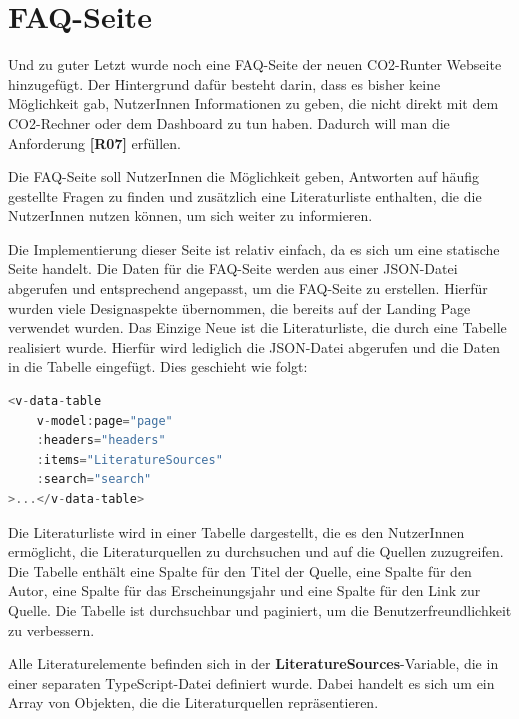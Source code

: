 \section{FAQ-Seite}

Und zu guter Letzt wurde noch eine FAQ-Seite der neuen CO2-Runter Webseite hinzugefügt. Der Hintergrund dafür besteht darin, dass es bisher keine Möglichkeit gab, NutzerInnen Informationen zu geben, die nicht direkt mit dem CO2-Rechner oder dem Dashboard zu tun haben. Dadurch will man die Anforderung \textbf{[R07]} erfüllen.

Die FAQ-Seite soll NutzerInnen die Möglichkeit geben, Antworten auf häufig gestellte Fragen zu finden und zusätzlich eine Literaturliste enthalten, die die NutzerInnen nutzen können, um sich weiter zu informieren.


Die Implementierung dieser Seite ist relativ einfach, da es sich um eine statische Seite handelt. Die Daten für die FAQ-Seite werden aus einer \acs{JSON}-Datei abgerufen und entsprechend angepasst, um die FAQ-Seite zu erstellen. Hierfür wurden viele Designaspekte übernommen, die bereits auf der Landing Page verwendet wurden. Das Einzige Neue ist die Literaturliste, die durch eine Tabelle realisiert wurde. Hierfür wird lediglich die \acs{JSON}-Datei abgerufen und die Daten in die Tabelle eingefügt. Dies geschieht wie folgt:

\begin{lstlisting}[language={JavaScript}, caption={Laden der Literaturliste}]
<v-data-table
    v-model:page="page"
    :headers="headers"
    :items="LiteratureSources"
    :search="search"
>...</v-data-table>
\end{lstlisting}

Die Literaturliste wird in einer Tabelle dargestellt, die es den NutzerInnen ermöglicht, die Literaturquellen zu durchsuchen und auf die Quellen zuzugreifen. Die Tabelle enthält eine Spalte für den Titel der Quelle, eine Spalte für den Autor, eine Spalte für das Erscheinungsjahr und eine Spalte für den Link zur Quelle. Die Tabelle ist durchsuchbar und paginiert, um die Benutzerfreundlichkeit zu verbessern.

Alle Literaturelemente befinden sich in der \textbf{LiteratureSources}-Variable, die in einer separaten TypeScript-Datei definiert wurde. Dabei handelt es sich um ein Array von Objekten, die die Literaturquellen repräsentieren.


